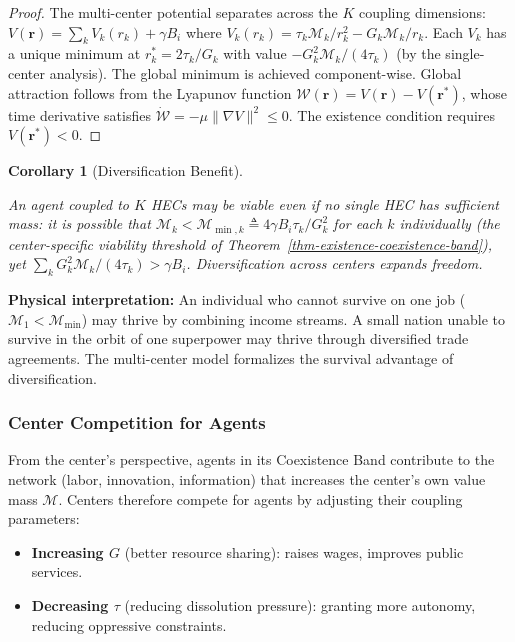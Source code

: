 \documentclass[11pt]{article}
\theoremstyle{plain}
\newtheorem{corollary}[theorem]{Corollary}
\theoremstyle{definition}
\theoremstyle{remark}
\let\origsubsubsection\subsubsection
\renewcommand{\subsubsection}{\needspace{4\baselineskip}\origsubsubsection}
\providecommand{\tightlist}{%
  \setlength{\itemsep}{0pt}\setlength{\parskip}{0pt}}
\begin{document}
\begin{proof}
The multi-center potential separates across the $K$ coupling dimensions: $V(\mathbf{r}) = \sum_k V_k(r_k) + \gamma B_i$ where $V_k(r_k) = \tau_k \mathcal{M}_k / r_k^2 - G_k \mathcal{M}_k / r_k$. Each $V_k$ has a unique minimum at $r_k^* = 2\tau_k/G_k$ with value $-G_k^2\mathcal{M}_k/(4\tau_k)$ (by the single-center analysis). The global minimum is achieved component-wise. Global attraction follows from the Lyapunov function $\mathcal{W}(\mathbf{r}) = V(\mathbf{r}) - V(\mathbf{r}^*)$, whose time derivative satisfies $\dot{\mathcal{W}} = -\mu\|\nabla V\|^2 \leq 0$. The existence condition requires $V(\mathbf{r}^*) < 0$.
\end{proof}

\begin{corollary}[Diversification Benefit]
\label{cor-diversification-benefit}

An agent coupled to $K$ HECs may be viable even if no single HEC has sufficient mass: it is possible that $\mathcal{M}_k < \mathcal{M}_{\min,k} \triangleq 4\gamma B_i \tau_k / G_k^2$ for each $k$ individually (the center-specific viability threshold of Theorem~\ref{thm-existence-coexistence-band}), yet $\sum_k G_k^2\mathcal{M}_k/(4\tau_k) > \gamma B_i$. Diversification across centers expands freedom.
\end{corollary}

\textbf{Physical interpretation:} An individual who cannot survive on
one job (\(\mathcal{M}_1 < \mathcal{M}_{\min}\)) may thrive by combining
income streams. A small nation unable to survive in the orbit of one
superpower may thrive through diversified trade agreements. The
multi-center model formalizes the survival advantage of diversification.

\subsubsection{Center Competition for
Agents}\label{center-competition-for-agents}

From the center's perspective, agents in its Coexistence Band contribute
to the network (labor, innovation, information) that increases the
center's own value mass \(\mathcal{M}\). Centers therefore compete for
agents by adjusting their coupling parameters:

\begin{itemize}
\tightlist
\item
  \textbf{Increasing \(G\)} (better resource sharing): raises wages,
  improves public services.
\item
  \textbf{Decreasing \(\tau\)} (reducing dissolution pressure): granting
  more autonomy, reducing oppressive constraints.
\end{itemize}
\end{document}

